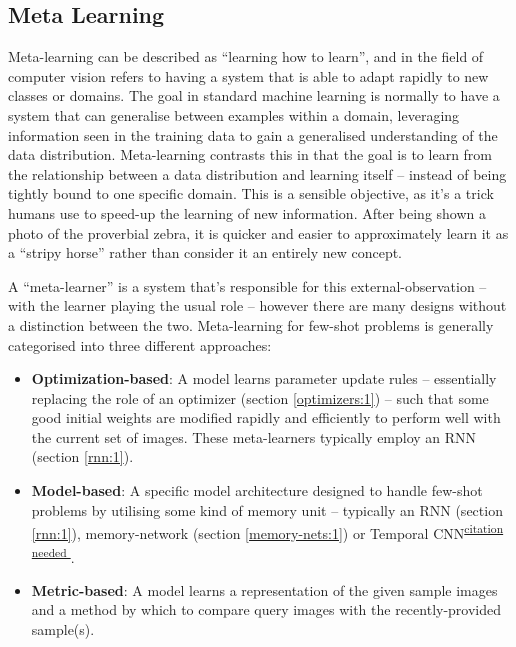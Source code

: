 \documentclass{report}
\newcommand{\TOCITE}[1]{\textsuperscript{\underline{citation needed #1}}}
\begin{document}
	\subsection{Meta Learning}
	Meta-learning can be described as ``learning how to learn'', and in the field of computer vision refers to having a system that is able to adapt rapidly to new classes or domains. The goal in standard machine learning is normally to have a system that can generalise between examples within a domain, leveraging information seen in the training data to gain a generalised understanding of the data distribution. Meta-learning contrasts this in that the goal is to learn from the relationship between a data distribution and learning itself -- instead of being tightly bound to one specific domain. This is a sensible objective, as it's a trick humans use to speed-up the learning of new information. After being shown a photo of the proverbial zebra, it is quicker and easier to approximately learn it as a ``stripy horse'' rather than consider it an entirely new concept. \par
	A ``meta-learner'' is a system that's responsible for this external-observation -- with the learner playing the usual role -- however there are many designs without a distinction between the two. Meta-learning for few-shot problems is generally categorised into three different approaches:
	\begin{itemize}
		\item \textbf{Optimization-based}: A model learns parameter update rules -- essentially replacing the role of an optimizer (section \ref{optimizers:1}) -- such that some good initial weights are modified rapidly and efficiently to perform well with the current set of images. These meta-learners typically employ an RNN (section \ref{rnn:1}).
		\item \textbf{Model-based}: A specific model architecture designed to handle few-shot problems by utilising some kind of memory unit -- typically an RNN (section \ref{rnn:1}), memory-network (section \ref{memory-nets:1}) or Temporal CNN\TOCITE{}.
		\item \textbf{Metric-based}: A model learns a representation of the given sample images and a method by which to compare query images with the recently-provided sample(s).
	\end{itemize}
\end{document}
